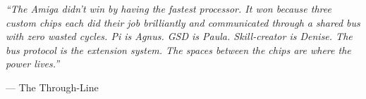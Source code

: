 \documentclass[11pt,letterpaper]{article}
\begin{document}
\vspace{2em}

\begin{quotebox}
\textit{``The Amiga didn't win by having the fastest processor. It won because three custom chips each did their job brilliantly and communicated through a shared bus with zero wasted cycles. Pi is Agnus. GSD is Paula. Skill-creator is Denise. The bus protocol is the extension system. The spaces between the chips are where the power lives.''}

\vspace{0.5em}
\hfill --- The Through-Line
\end{quotebox}
\end{document}
